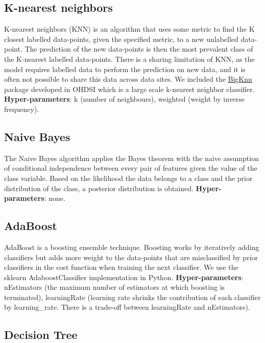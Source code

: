 \documentclass[11pt]{book}
\begin{document}
\subsection{K-nearest neighbors}\label{k-nearest-neighbors}

K-nearest neighbors (KNN) is an algorithm that uses some metric to find
the K closest labelled data-points, given the specified metric, to a new
unlabelled data-point. The prediction of the new data-points is then the
most prevalent class of the K-nearest labelled data-points. There is a
sharing limitation of KNN, as the model requires labelled data to
perform the prediction on new data, and it is often not possible to
share this data across data sites. We included the
\href{https://github.com/OHDSI/BigKnn}{BigKnn} package developed in
OHDSI which is a large scale k-nearest neighbor classifier.
\textbf{Hyper-parameters}: k (number of neighbours), weighted (weight by
inverse frequency).

\subsection{Naive Bayes}\label{naive-bayes}

The Naive Bayes algorithm applies the Bayes theorem with the naive
assumption of conditional independence between every pair of features
given the value of the class variable. Based on the likelihood the data
belongs to a class and the prior distribution of the class, a posterior
distribution is obtained. \textbf{Hyper-parameters}: none.

\subsection{AdaBoost}\label{adaboost}

AdaBoost is a boosting ensemble technique. Boosting works by iteratively
adding classifiers but adds more weight to the data-points that are
misclassified by prior classifiers in the cost function when training
the next classifier. We use the sklearn AdaboostClassifier
implementation in Python. \textbf{Hyper-parameters}: nEstimators (the
maximum number of estimators at which boosting is terminated),
learningRate (learning rate shrinks the contribution of each classifier
by learning\_rate. There is a trade-off between learningRate and
nEstimators).

\subsection{Decision Tree}\label{decision-tree}
\end{document}
